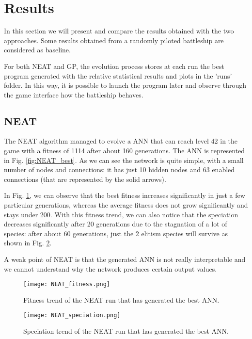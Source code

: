 \section{Results}
In this section we will present and compare the results obtained with the two approaches. 
Some results obtained from a randomly piloted battleship are considered as baseline.

For both NEAT and GP, the evolution process stores at each run the best program generated with the
relative statistical results and plots in the 'runs' folder. In this way, it is
possible to launch the program later and observe through the game interface how the battleship behaves.


\subsection{NEAT}
The NEAT algorithm managed to evolve a ANN that can reach level 42 in the game with a
fitness of 1114 after about 160 generations. The ANN is represented in Fig. \ref{fig:NEAT_best}. As we can
see the network is quite simple, with a small number of nodes and connections: it has just 10
hidden nodes and 63 enabled connections (that are represented by the solid arrows).


In Fig. \ref{fig:NEAT_fitness}, we can observe that the best fitness increases significantly in just a few particular
generations, whereas the average fitness does not grow significantly and stays under 200.
With this fitness trend, we can also notice that the speciation decreases significantly after 20
generations due to the stagnation of a lot of species: after about 60 generations, 
just the 2 elitism species will survive as shown in Fig. \ref{fig:NEAT_speciation}.

A weak point of NEAT is that the generated ANN is not really interpretable and we cannot
understand why the network produces certain output values.

\begin{figure}[ht]
\centerline{\texttt{[image: NEAT\_fitness.png]}}
\caption{Fitness trend of the NEAT run that has generated the best ANN.}
\label{fig:NEAT_fitness}
\end{figure}


\begin{figure}[ht]
\centerline{\texttt{[image: NEAT\_speciation.png]}}
\caption{Speciation trend of the NEAT run that has generated the best ANN.}
\label{fig:NEAT_speciation}
\end{figure}


